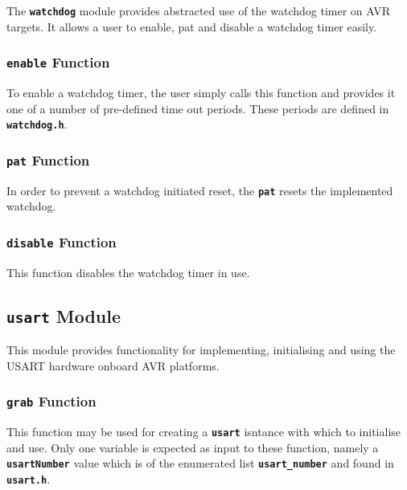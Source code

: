 \documentclass[a4paper, oneside, 11pt, titlepage, onecolumn, openright]{article}
\begin{document}
			The \textbf{\texttt{watchdog}} module provides abstracted use of the watchdog timer on AVR targets. It allows a user to enable, pat and disable a watchdog timer easily.

\subsubsection{\textbf{\texttt{enable}} Function}
			\label{sss:HALwatchdogenableFunction}
			
			To enable a watchdog timer, the user simply calls this function and provides it one of a number of pre-defined time out periods. These periods are defined in \textbf{\texttt{watchdog.h}}.
						
\subsubsection{\textbf{\texttt{pat}} Function}
			\label{sss:HALwatchdogpatFunction}
			
			In order to prevent a watchdog initiated reset, the {\textbf{\texttt{pat}}} resets the implemented watchdog.
			
\subsubsection{\textbf{\texttt{disable}} Function}
			\label{sss:HALwatchdogdisableFunction}
			
			This function disables the watchdog timer in use.
			
\subsection{\textbf{\texttt{usart}} Module}
			\label{ss:HALusartModule}
			
			This module provides functionality for implementing, initialising and using the USART hardware onboard AVR platforms.
			
\subsubsection{\textbf{\texttt{grab}} Function}
			\label{sss:HALusartgrabFunction}
			
			This function may be used for creating a \textbf{\texttt{usart}} isntance with which to initialise and use. Only one variable is expected as input to these function, namely a \textbf{\texttt{usartNumber}} value which is of the enumerated list \textbf{\texttt{usart\_number}} and found in \textbf{\texttt{usart.h}}.
						
\end{document}
